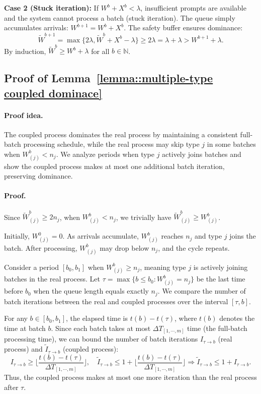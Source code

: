 \textbf{Case 2 (Stuck iteration):} If $W^b + X^b < \lambda$, insufficient prompts are available and the system cannot process a batch (stuck iteration). The queue simply accumulates arrivals: $W^{b+1} = W^b + X^b$. The safety buffer ensures dominance:
$$\tilde{W}^{b+1}=\max\{ 2\lambda, \tilde{W}^b + X^b - \lambda \}\geq 2\lambda = \lambda+\lambda>W^{b+1}+\lambda.$$
By induction, $\tilde{W}^b \geq W^b + \lambda$ for all $b \in \mathbb{N}$.

\subsection{Proof of Lemma~\ref{lemma::multiple-type coupled dominace}}\label{appendix_lemma::proof of multiple-type coupled dominace}
\paragraph{Proof idea.} The coupled process dominates the real process by maintaining a consistent full-batch processing schedule, while the real process may skip type $j$ in some batches when $W^b_{(j)} < n_j$. We analyze periods when type $j$ actively joins batches and show the coupled process makes at most one additional batch iteration, preserving dominance.

\paragraph{Proof.} Since $\tilde{W}_{(j)}^b\geq 2n_j$, when $W^b_{(j)}< n_j$, we trivially have $\tilde{W}_{(j)}^b\geq W^b_{(j)}$.

Initially, $W^0_{(j)}=0$. As arrivals accumulate, $W^b_{(j)}$ reaches $n_j$ and type $j$ joins the batch. After processing, $W^b_{(j)}$ may drop below $n_j$, and the cycle repeats.

Consider a period $[b_0, b_1]$ when $W^b_{(j)}\geq n_j$, meaning type $j$ is actively joining batches in the real process. Let $\tau = \max\{b\leq b_0: W^b_{(j)} = n_j \}$ be the last time before $b_0$ when the queue length equals exactly $n_j$. We compare the number of batch iterations between the real and coupled processes over the interval $[\tau, b]$.

For any $b\in [b_0, b_1]$, the elapsed time is $t(b) - t(\tau)$, where $t(b)$ denotes the time at batch $b$. Since each batch takes at most $\Delta T_{[1,\cdots,m]}$ time (the full-batch processing time), we can bound the number of batch iterations $I_{\tau\to b}$ (real process) and $\tilde{I}_{\tau\to b}$ (coupled process):
$$I_{\tau\to b} \geq \lfloor\frac{t(b)-t(\tau)}{\Delta T_{[1,\cdots,m]}}\rfloor ,\quad \tilde{I}_{\tau\to b}\leq 1+\lfloor\frac{t(b)-t(\tau)}{\Delta T_{[1,\cdots,m]}}\rfloor \Rightarrow \tilde{I}_{\tau\to b}\leq 1+I_{\tau\to b}.$$
Thus, the coupled process makes at most one more iteration than the real process after $\tau$.

